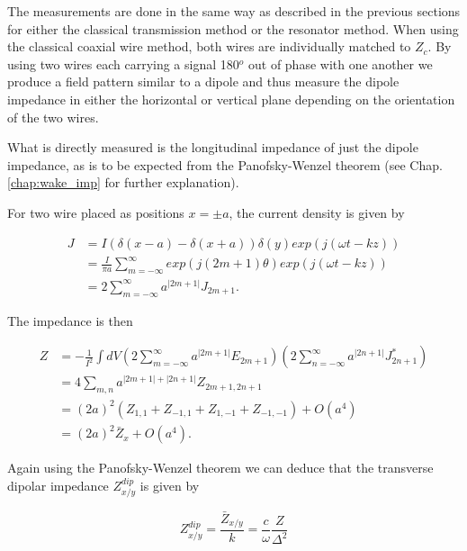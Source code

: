 \documentclass[12pt,a4paper,twopage,openright]{article}
\begin{document}
The measurements are done in the same way as described in the previous sections for either the classical transmission method or the resonator method. When using the classical coaxial wire method, both wires are individually matched to $Z_{c}$. By using two wires each carrying a signal 180$^{o}$ out of phase with one another we produce a field pattern similar to a dipole and thus measure the dipole impedance in either the horizontal or vertical plane depending on the orientation of the two wires. 

What is directly measured is the longitudinal impedance of just the dipole impedance, as is to be expected from the Panofsky-Wenzel theorem (see Chap. \ref{chap:wake_imp} for further explanation). 

For two wire placed as positions $x = \pm a$, the current density is given by \cite{Tsutsui:OnSingleWire}

\begin{align}
J & =  I \left( \delta \left( x - a \right) - \delta \left( x + a  \right) \right) \delta (y) exp \left( j \left( \omega t - kz \right) \right) \nonumber \\
& =  \frac{I}{\pi a} \displaystyle\sum\limits_{m=-\infty}^{\infty} exp \left(j \left( 2m +1 \right) \theta \right) exp \left( j \left( \omega t - kz \right) \right) \nonumber \\
& =  2\displaystyle\sum\limits_{m=-\infty}^{\infty} a^{|2m + 1 |} J_{2m + 1}.
\end{align}

The impedance is then

\begin{align}
Z & =  - \frac{1}{I^{2}} \int dV \left( 2\displaystyle\sum\limits_{m=-\infty}^{\infty} a^{|2m + 1 |} E_{2m + 1}  \right)  \left( 2\displaystyle\sum\limits_{n=-\infty}^{\infty} a^{|2n + 1 |} J_{2n + 1}^{*}  \right) \nonumber \\
& =  4 \displaystyle\sum\limits_{m,n} a^{|2m + 1 | + |2n + 1|} Z_{2m + 1, 2n+1} \nonumber \\
& =  \left(2a \right)^{2}\left( Z_{1,1} + Z_{-1,1} + Z_{1,-1} + Z_{-1,-1} \right) + O(a^{4}) \nonumber \\
& =  (2a)^{2}\bar{Z}_{x} + O(a^{4}). 
\end{align}

Again using the Panofsky-Wenzel theorem we can deduce that the transverse dipolar impedance $Z^{dip}_{x/y}$ is given by 

\begin{equation}
Z^{dip}_{x/y} = \frac{\bar{Z}_{x/y}}{k} = \frac{c}{\omega} \frac{Z}{\Delta^{2}}
\end{equation}
\end{document}
